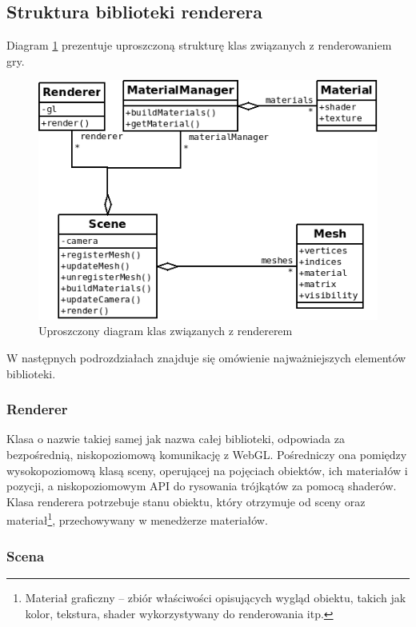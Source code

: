 \subsection{Struktura biblioteki renderera}

Diagram \ref{fig:renderer} prezentuje uproszczoną strukturę klas związanych z renderowaniem gry.

\begin{figure}[h!]
  \centering
  \includegraphics[scale=0.8]{zasoby/rozdzial31/renderer}  
  \caption{Uproszczony diagram klas związanych z rendererem}
  \label{fig:renderer}
\end{figure}

W następnych podrozdziałach znajduje się omówienie najważniejszych elementów biblioteki.

\subsubsection{Renderer}

Klasa o nazwie takiej samej jak nazwa całej biblioteki, odpowiada za bezpośrednią, niskopoziomową
komunikację z WebGL. Pośredniczy ona pomiędzy wysokopoziomową klasą sceny, operującej na
pojęciach obiektów, ich materiałów i pozycji, a niskopoziomowym API do rysowania trójkątów
za pomocą shaderów. Klasa renderera potrzebuje stanu obiektu, który otrzymuje od sceny
oraz materiał\footnote{Materiał graficzny -- zbiór właściwości opisujących wygląd obiektu, takich jak
kolor, tekstura, shader wykorzystywany do renderowania itp.}, przechowywany w menedżerze materiałów.

\subsubsection{Scena}

